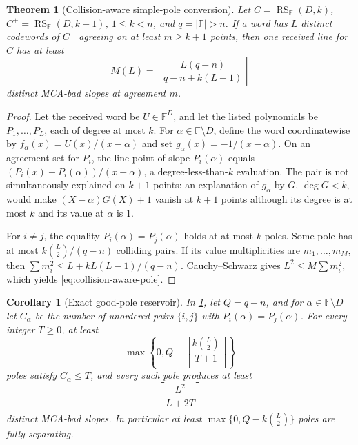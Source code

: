 \documentclass[11pt,a4paper]{amsart}
\numberwithin{equation}{section}
\newtheorem{theorem}{Theorem}[section]
\newtheorem{corollary}[corollary]{Corollary}
\theoremstyle{remark}
\DeclareMathOperator{\RS}{RS}
\newcommand{\F}{\mathbb F}
\newcommand{\abs}[1]{\lvert #1\rvert}
\newcommand{\floor}[1]{\left\lfloor #1\right\rfloor}
\newcommand{\ceil}[1]{\left\lceil #1\right\rceil}
\begin{document}
\begin{theorem}[Collision-aware simple-pole conversion]
\label{thm:collision-aware-pole}
Let \(C=\RS_\F(D,k)\), \(C^+=\RS_\F(D,k+1)\), \(1\le k<n\), and
\(q=\abs\F>n\).  If a word has \(L\) distinct codewords of \(C^+\)
agreeing on at least \(m\ge k+1\) points, then one received line for \(C\)
has at least
\[
 M(L)=\left\lceil
 \frac{L(q-n)}{q-n+k(L-1)}
 \right\rceil
 \tag{4.2}\label{eq:collision-aware-pole}
\]
distinct MCA-bad slopes at agreement \(m\).
\end{theorem}

\begin{proof}
Let the received word be \(U\in\F^D\), and let the listed polynomials be
\(P_1,\ldots,P_L\), each of degree at most \(k\).  For
\(\alpha\in\F\setminus D\), define the word coordinatewise by
\(f_\alpha(x)=U(x)/(x-\alpha)\) and set
\(g_\alpha(x)=-1/(x-\alpha)\).  On an agreement set for \(P_i\), the line
point of slope \(P_i(\alpha)\) equals
\((P_i(x)-P_i(\alpha))/(x-\alpha)\), a degree-less-than-\(k\) evaluation.
The pair is not simultaneously explained on \(k+1\) points: an explanation
of \(g_\alpha\) by \(G\), \(\deg G<k\), would make
\((X-\alpha)G(X)+1\) vanish at \(k+1\) points although its degree is at
most \(k\) and its value at \(\alpha\) is \(1\).

For \(i\ne j\), the equality \(P_i(\alpha)=P_j(\alpha)\) holds at at most
\(k\) poles.  Some pole has at most \(k\binom L2/(q-n)\) colliding pairs.
If its value multiplicities are \(m_1,\ldots,m_M\), then
\(\sum m_i^2\le L+kL(L-1)/(q-n)\).  Cauchy--Schwarz gives
\(L^2\le M\sum m_i^2\), which yields \eqref{eq:collision-aware-pole}.
\end{proof}

\begin{corollary}[Exact good-pole reservoir]
\label{cor:exact-good-pole-reservoir}
In \cref{thm:collision-aware-pole}, let \(Q=q-n\), and for
\(\alpha\in\F\setminus D\) let \(C_\alpha\) be the number of unordered
pairs \(\{i,j\}\) with \(P_i(\alpha)=P_j(\alpha)\).  For every integer
\(T\ge0\), at least
\[
 \max\left\{0,Q-
   \floor{\frac{k\binom L2}{T+1}}\right\}          \tag{PR1}
\label{eq:good-pole-count}
\]
poles satisfy \(C_\alpha\le T\), and every such pole produces at least
\[
                     \ceil{\frac{L^2}{L+2T}}       \tag{PR2}
\label{eq:good-pole-slopes}
\]
distinct MCA-bad slopes.  In particular at least
\(\max\{0,Q-k\binom L2\}\) poles are fully separating.
\end{corollary}
\end{document}
